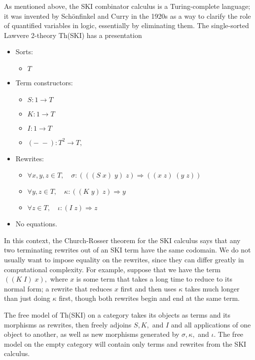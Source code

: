 \documentclass{llncs}
\newcommand{\maps}{\colon}
\begin{document}
As mentioned above, the SKI combinator calculus is a Turing-complete language; it was invented by Sch\"onfinkel \cite{Schonfinkel} and Curry \cite{Curry} in the 1920s as a way to clarify the role of quantified variables in logic, essentially by eliminating them.  The single-sorted Lawvere 2-theory Th(SKI) has a presentation
\begin{center}
  \begin{itemize}
    \item Sorts:
    \begin{itemize}
      \item $T$
    \end{itemize}
    \item Term constructors:
    \begin{itemize}
      \item $S\maps 1 \to T$
      \item $K\maps 1 \to T$
      \item $I\maps 1 \to T$
      \item $(-\;-)\maps T^2 \to T,$
    \end{itemize}
    \item Rewrites:
    \begin{itemize}
      \item $\forall x,y,z \in T, \quad \sigma \maps (((S\; x)\; y)\; z) \Rightarrow ((x\; z)\; (y\; z))$
      \item $\forall y,z \in T, \quad \kappa \maps ((K\; y)\; z) \Rightarrow y$
      \item $\forall z \in T, \quad \iota \maps (I\; z) \Rightarrow z$
    \end{itemize}
    \item No equations.
  \end{itemize}
\end{center}
In this context, the Church-Rosser theorem for the SKI calculus says that any two terminating rewrites out of an SKI term have the same codomain.  We do not usually want to impose equality on the rewrites, since they can differ greatly in computational complexity.  For example, suppose that we have the term $((K\; I)\; x),$ where $x$ is some term that takes a long time to reduce to its normal form; a rewrite that reduces $x$ first and then uses $\kappa$ takes much longer than just doing $\kappa$ first, though both rewrites begin and end at the same term.

The free model of Th(SKI) on a category takes its objects as terms and its morphisms as rewrites, then freely adjoins $S,K,$ and $I$ and all applications of one object to another, as well as new morphisms generated by $\sigma,\kappa,$ and $\iota.$  The free model on the empty category will contain only terms and rewrites from the SKI calculus.
\end{document}
